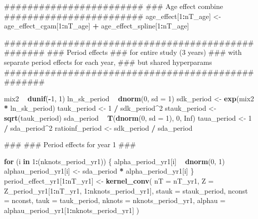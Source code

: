 \documentclass[11pt,]{article}
\newenvironment{Shaded}{\begin{snugshade}}{\end{snugshade}}
\newcommand{\KeywordTok}[1]{\textcolor[rgb]{0.13,0.29,0.53}{\textbf{#1}}}
\newcommand{\DataTypeTok}[1]{\textcolor[rgb]{0.13,0.29,0.53}{#1}}
\newcommand{\DecValTok}[1]{\textcolor[rgb]{0.00,0.00,0.81}{#1}}
\newcommand{\StringTok}[1]{\textcolor[rgb]{0.31,0.60,0.02}{#1}}
\newcommand{\OtherTok}[1]{\textcolor[rgb]{0.56,0.35,0.01}{#1}}
\newcommand{\ControlFlowTok}[1]{\textcolor[rgb]{0.13,0.29,0.53}{\textbf{#1}}}
\newcommand{\OperatorTok}[1]{\textcolor[rgb]{0.81,0.36,0.00}{\textbf{#1}}}
\newcommand{\NormalTok}[1]{#1}
\begin{document}
\begin{Shaded}
\begin{Highlighting}[]
\NormalTok{  ########################}
\NormalTok{  ### Age effect combine}
\NormalTok{  ########################}
\NormalTok{  age_effect[}\DecValTok{1}\OperatorTok{:}\NormalTok{nT_age] <-}\StringTok{ }\NormalTok{age_effect_cgam[}\DecValTok{1}\OperatorTok{:}\NormalTok{nT_age] }\OperatorTok{+}
\StringTok{                          }\NormalTok{age_effect_spline[}\DecValTok{1}\OperatorTok{:}\NormalTok{nT_age]}

\NormalTok{  ##################################################}
\NormalTok{  ### Period effects}
\NormalTok{  ### for entire study (3 years)}
\NormalTok{  ### with separate period effects for each year,}
\NormalTok{  ### but shared hyperparams}
\NormalTok{  ##################################################}

\NormalTok{  mix2 }\OperatorTok{~}\StringTok{ }\KeywordTok{dunif}\NormalTok{(}\OperatorTok{-}\DecValTok{1}\NormalTok{, }\DecValTok{1}\NormalTok{)}
\NormalTok{  ln_sk_period }\OperatorTok{~}\StringTok{ }\KeywordTok{dnorm}\NormalTok{(}\DecValTok{0}\NormalTok{, }\DataTypeTok{sd =} \DecValTok{1}\NormalTok{)}
\NormalTok{  sdk_period <-}\StringTok{ }\KeywordTok{exp}\NormalTok{(mix2 }\OperatorTok{*}\StringTok{ }\NormalTok{ln_sk_period)}
\NormalTok{  tauk_period <-}\StringTok{ }\DecValTok{1} \OperatorTok{/}\StringTok{ }\NormalTok{sdk_period}\OperatorTok{^}\DecValTok{2}
\NormalTok{  stauk_period <-}\StringTok{ }\KeywordTok{sqrt}\NormalTok{(tauk_period)}
\NormalTok{  sda_period }\OperatorTok{~}\StringTok{ }\KeywordTok{T}\NormalTok{(}\KeywordTok{dnorm}\NormalTok{(}\DecValTok{0}\NormalTok{, }\DataTypeTok{sd =} \DecValTok{1}\NormalTok{), }\DecValTok{0}\NormalTok{, }\OtherTok{Inf}\NormalTok{)}
\NormalTok{  taua_period <-}\StringTok{ }\DecValTok{1} \OperatorTok{/}\StringTok{ }\NormalTok{sda_period}\OperatorTok{^}\DecValTok{2}
\NormalTok{  ratioinf_period <-}\StringTok{ }\NormalTok{sdk_period }\OperatorTok{/}\StringTok{ }\NormalTok{sda_period}

\NormalTok{  ###}
\NormalTok{  ### Period effects for year 1}
\NormalTok{  ###}

  \ControlFlowTok{for}\NormalTok{ (i }\ControlFlowTok{in} \DecValTok{1}\OperatorTok{:}\NormalTok{(nknots_period_yr1)) \{}
\NormalTok{    alpha_period_yr1[i] }\OperatorTok{~}\StringTok{ }\KeywordTok{dnorm}\NormalTok{(}\DecValTok{0}\NormalTok{, }\DecValTok{1}\NormalTok{)}
\NormalTok{    alphau_period_yr1[i] <-}\StringTok{ }\NormalTok{sda_period }\OperatorTok{*}\StringTok{ }\NormalTok{alpha_period_yr1[i]}
\NormalTok{  \}}
\NormalTok{  period_effect_yr1[}\DecValTok{1}\OperatorTok{:}\NormalTok{nT_yr1] <-}\StringTok{ }\KeywordTok{kernel_conv}\NormalTok{(}
    \DataTypeTok{nT =}\NormalTok{ nT_yr1,}
    \DataTypeTok{Z =}\NormalTok{ Z_period_yr1[}\DecValTok{1}\OperatorTok{:}\NormalTok{nT_yr1, }\DecValTok{1}\OperatorTok{:}\NormalTok{nknots_period_yr1],}
    \DataTypeTok{stauk =}\NormalTok{ stauk_period,}
    \DataTypeTok{nconst =}\NormalTok{ nconst,}
    \DataTypeTok{tauk =}\NormalTok{ tauk_period,}
    \DataTypeTok{nknots =}\NormalTok{ nknots_period_yr1,}
    \DataTypeTok{alphau =}\NormalTok{ alphau_period_yr1[}\DecValTok{1}\OperatorTok{:}\NormalTok{nknots_period_yr1]}
\NormalTok{  )}


\end{Highlighting}
\end{Shaded}
\end{document}
